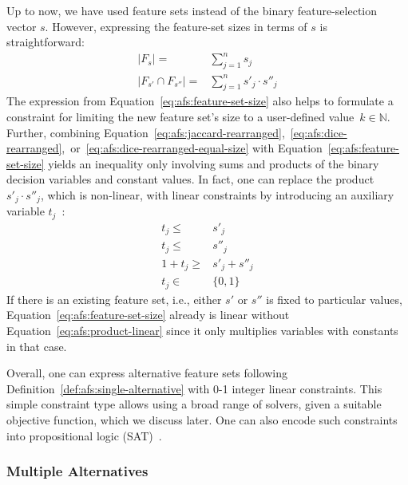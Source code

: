 \documentclass{article}
\theoremstyle{definition}
\begin{document}
Up to now, we have used feature sets instead of the binary feature-selection vector $s$.
However, expressing the feature-set sizes in terms of $s$ is straightforward:
%
\begin{equation}
	\begin{aligned}
		|F_s| =& \sum_{j=1}^n s_j \\
		|F_{s'} \cap F_{s''}| =& \sum_{j=1}^n s'_j \cdot s''_j
	\end{aligned}
	\label{eq:afs:feature-set-size}
\end{equation}
%
The expression from Equation~\ref{eq:afs:feature-set-size} also helps to formulate a constraint for limiting the new feature set's size to a user-defined value~$k \in \mathbb{N}$.
Further, combining Equation~\ref{eq:afs:jaccard-rearranged},~\ref{eq:afs:dice-rearranged},~or~\ref{eq:afs:dice-rearranged-equal-size} with Equation~\ref{eq:afs:feature-set-size} yields an inequality only involving sums and products of the binary decision variables and constant values.
In fact, one can replace the product $s'_j \cdot s''_j$, which is non-linear, with linear constraints by introducing an auxiliary variable $t_j$~\cite{mosek2022modeling}:
%
\begin{equation}
	\begin{aligned}
		t_j \leq& s'_j \\
		t_j \leq& s''_j \\
		1 + t_j \geq& s'_j + s''_j \\
		t_j \in& \{0,1\}
	\end{aligned}
	\label{eq:afs:product-linear}
\end{equation}
%
If there is an existing feature set, i.e., either $s'$ or $s''$ is fixed to particular values, Equation~\ref{eq:afs:feature-set-size} already is linear without Equation~\ref{eq:afs:product-linear} since it only multiplies variables with constants in that case.

Overall, one can express alternative feature sets following Definition~\ref{def:afs:single-alternative} with 0-1 integer linear constraints.
This simple constraint type allows using a broad range of solvers, given a suitable objective function, which we discuss later.
One can also encode such constraints into propositional logic (SAT)~\cite{ulrich2022selecting}.

\subsubsection{Multiple Alternatives}
\label{sec:afs:approach:constraints:multiple}
\end{document}
